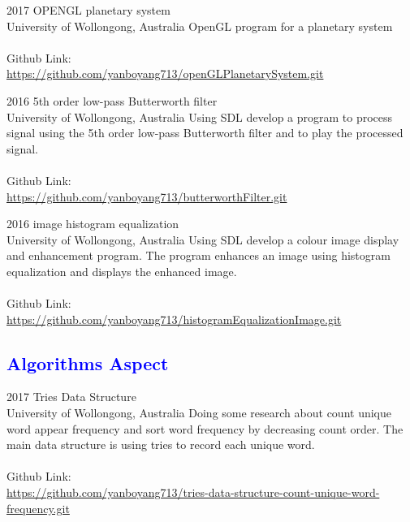\documentclass[]{friggeri-cv}
\begin{document}
\begin{entrylist}
  \entry
    {2017}
    {OPENGL planetary system\\}
    {University of Wollongong, Australia}
    {OpenGL program for a planetary system
    \\\\ Github Link: \\{\small\url{https://github.com/yanboyang713/openGLPlanetarySystem.git}}}
\end{entrylist}

\begin{entrylist}
  \entry
    {2016}
    {5th order low-pass Butterworth filter\\}
    {University of Wollongong, Australia}
    {Using SDL develop a program to process signal using the 5th order low-pass Butterworth filter and to play the processed signal.
     \\\\ Github Link: \\{\small\url{https://github.com/yanboyang713/butterworthFilter.git}}}
\end{entrylist}

\begin{entrylist}
  \entry
    {2016}
    {image histogram equalization\\}
    {University of Wollongong, Australia}
    {Using SDL develop a colour image display and enhancement program. The program enhances an image using histogram equalization and displays the enhanced image.
     \\\\ Github Link: \\{\small\url{https://github.com/yanboyang713/histogramEqualizationImage.git}}}
\end{entrylist}

\subsection{\textcolor{blue}{Algorithms Aspect}}

\begin{entrylist}
  \entry
    {2017}
    {Tries Data Structure\\}
    {University of Wollongong, Australia}
    {Doing some research about count unique word appear frequency and sort word frequency by decreasing count order. The main data structure is using tries to record each unique word.
     \\\\ Github Link: \\{\small\url{https://github.com/yanboyang713/tries-data-structure-count-unique-word-frequency.git}}}
\end{entrylist}
\end{document}
